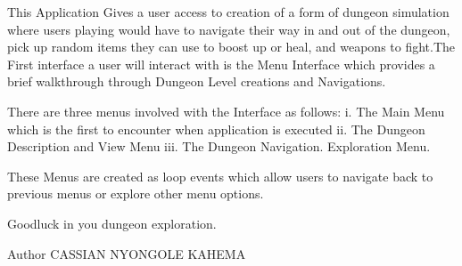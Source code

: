 This Application Gives a user access to creation of a form of dungeon simulation where users playing would have to navigate their way in and out of the dungeon, pick up random items they can use to boost up or heal, and weapons to fight.\+The First interface a user will interact with is the Menu Interface which provides a brief walkthrough through Dungeon Level creations and Navigations.

There are three menus involved with the Interface as follows\+: i. The Main Menu which is the first to encounter when application is executed ii. The Dungeon Description and View Menu iii. The Dungeon Navigation. Exploration Menu.

These Menus are created as loop events which allow users to navigate back to previous menus or explore other menu options.

Goodluck in you dungeon exploration.

\begin{DoxyAuthor}{Author}
C\+A\+S\+S\+I\+AN N\+Y\+O\+N\+G\+O\+LE K\+A\+H\+E\+MA 
\end{DoxyAuthor}
